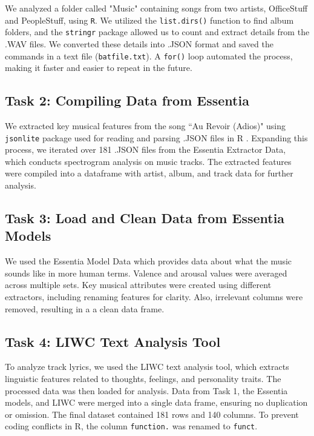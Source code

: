 \documentclass{article}\usepackage[]{graphicx}\usepackage[]{xcolor}
\begin{document}
\begin{multicols}{2}
We analyzed a folder called "Music" containing songs from two artists, OfficeStuff and PeopleStuff, using \texttt{R}. We utilized the \texttt{list.dirs()} function to find album folders, and the \texttt{stringr} package\citep{Wickham} allowed us to count and extract details from the .WAV files. We converted these details into .JSON format and saved the commands in a text file (\texttt{batfile.txt}). A \texttt{for()} loop automated the process, making it faster and easier to repeat in the future.

\subsection{Task 2: Compiling Data from Essentia}
We extracted key musical features from the song ``Au Revoir (Adios)" using \texttt{jsonlite} package used for reading and parsing .JSON files in R \citep{Ooms}. Expanding this process, we iterated over 181 .JSON files from the Essentia Extractor Data, which conducts spectrogram analysis on music tracks\citep{Bogdanov}. The extracted features were compiled into a dataframe with artist, album, and track data for further analysis.

\subsection{Task 3: Load and Clean Data from Essentia Models}

We used the Essentia Model Data which provides data about what the music sounds like in more human terms. Valence and arousal values were averaged across multiple sets. Key musical attributes were created using different extractors, including renaming features for clarity. Also, irrelevant columns were removed, resulting in a a clean data frame.

\subsection{Task 4: LIWC Text Analysis Tool}
To analyze track lyrics, we used the LIWC text analysis tool, which extracts linguistic features related to thoughts, feelings, and personality traits\citep{Boyd2022}. The processed data was then loaded for analysis. Data from Task 1, the Essentia models, and LIWC were merged into a single data frame, ensuring no duplication or omission. The final dataset contained 181 rows and 140 columns. To prevent coding conflicts in R, the column \texttt{function.} was renamed to \texttt{funct}. %


\end{multicols}
\end{document}
